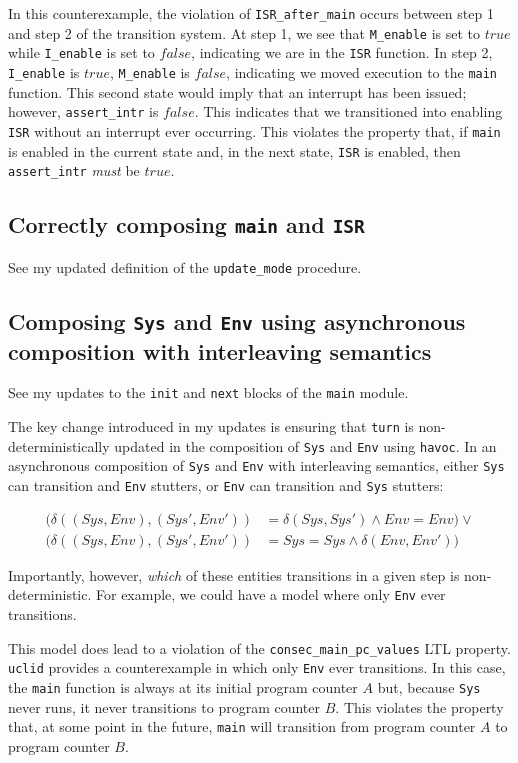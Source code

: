 \documentclass{article}
\newcommand{\code}[1]{\texttt{#1}}
\begin{document}
In this counterexample, the violation of \code{ISR\_after\_main} occurs between step 1 and step 2 of the transition system. At step 1, we see that \code{M\_enable} is set to $true$ while \code{I\_enable} is set to $false$, indicating we are in the \code{ISR} function. In step 2, \code{I\_enable} is $true$, \code{M\_enable} is $false$, indicating we moved execution to the \code{main} function. This second state would imply that an interrupt has been issued; however, \code{assert\_intr} is $false$. This indicates that we transitioned into enabling \code{ISR} without an interrupt ever occurring. This violates the property that, if \code{main} is enabled in the current state and, in the next state, \code{ISR} is enabled, then \code{assert\_intr} \emph{must} be $true$.

\subsection{Correctly composing \code{main} and \code{ISR}}

See my updated definition of the \code{update\_mode} procedure.

\subsection{Composing \code{Sys} and \code{Env} using asynchronous composition with interleaving semantics}

See my updates to the \code{init} and \code{next} blocks of the \code{main} module.

The key change introduced in my updates is ensuring that \code{turn} is non-deterministically updated in the composition of \code{Sys} and \code{Env} using \code{havoc}. In an asynchronous composition of \code{Sys} and \code{Env} with interleaving semantics, either \code{Sys} can transition and \code{Env} stutters, or \code{Env} can transition and \code{Sys} stutters:

\begin{align*}
(\delta((Sys, Env), (Sys', Env')) &= \delta(Sys, Sys') \land Env = Env) \lor \\
(\delta((Sys, Env), (Sys', Env')) &= Sys = Sys \land \delta(Env, Env'))
\end{align*}

Importantly, however, \emph{which} of these entities transitions in a given step is non-deterministic. For example, we could have a model where only \code{Env} ever transitions.

This model does lead to a violation of the \code{consec\_main\_pc\_values} LTL property. \code{uclid} provides a counterexample in which only \code{Env} ever transitions. In this case, the \code{main} function is always at its initial program counter $A$ but, because \code{Sys} never runs, it never transitions to program counter $B$. This violates the property that, at some point in the future, \code{main} will transition from program counter $A$ to program counter $B$.
\end{document}
